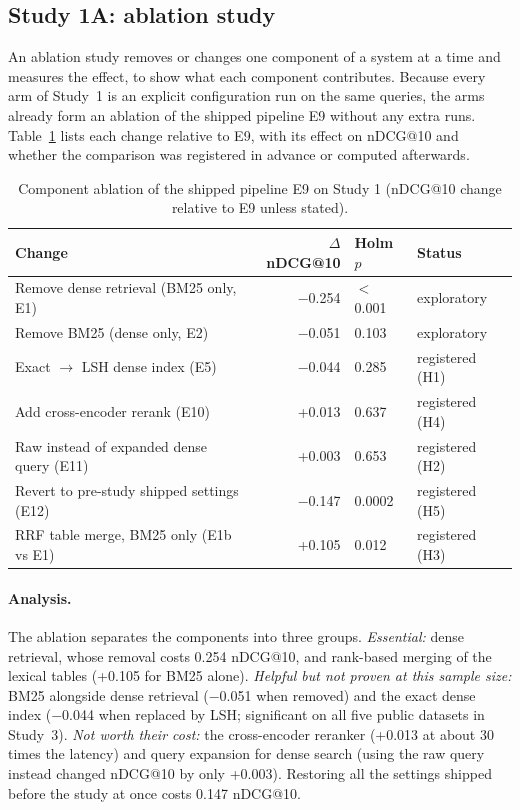 \documentclass[pdflatex,sn-basic,Numbered]{sn-jnl}
\makeatletter
\newcommand{\ndcg}{nDCG@10}
\makeatother
\begin{document}
\subsection{Study 1A: ablation study}

An ablation study removes or changes one component of a system at a time and measures the effect, to show what each component contributes. Because every arm of Study~1 is an explicit configuration run on the same queries, the arms already form an ablation of the shipped pipeline E9 without any extra runs. Table~\ref{tab:ablation} lists each change relative to E9, with its effect on \ndcg{} and whether the comparison was registered in advance or computed afterwards.

\begin{table}[tbp]
\centering\footnotesize\setlength{\tabcolsep}{3pt}
\caption{Component ablation of the shipped pipeline E9 on Study 1 (\ndcg{} change relative to E9 unless stated).}
\label{tab:ablation}
\begin{tabular}{lrll}
\toprule
Change & $\Delta$\ndcg{} & Holm $p$ & Status \\
\midrule
Remove dense retrieval (BM25 only, E1) & $-$0.254 & $<$0.001 & exploratory \\
Remove BM25 (dense only, E2) & $-$0.051 & 0.103 & exploratory \\
Exact $\rightarrow$ LSH dense index (E5) & $-$0.044 & 0.285 & registered (H1) \\
Add cross-encoder rerank (E10) & +0.013 & 0.637 & registered (H4)\footnotemark[1] \\
Raw instead of expanded dense query (E11) & +0.003 & 0.653 & registered (H2) \\
Revert to pre-study shipped settings (E12) & $-$0.147 & 0.0002 & registered (H5) \\
RRF table merge, BM25 only (E1b vs E1) & +0.105 & 0.012 & registered (H3) \\
\bottomrule
\end{tabular}
\end{table}

\paragraph{Analysis.} The ablation separates the components into three groups. \emph{Essential:} dense retrieval, whose removal costs 0.254 \ndcg{}, and rank-based merging of the lexical tables (+0.105 for BM25 alone). \emph{Helpful but not proven at this sample size:} BM25 alongside dense retrieval ($-$0.051 when removed) and the exact dense index ($-$0.044 when replaced by LSH; significant on all five public datasets in Study~3). \emph{Not worth their cost:} the cross-encoder reranker (+0.013 at about 30 times the latency) and query expansion for dense search (using the raw query instead changed \ndcg{} by only +0.003). Restoring all the settings shipped before the study at once costs 0.147 \ndcg{}.
\end{document}
